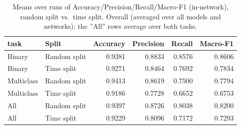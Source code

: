 \begin{table}
\caption{Means over runs of Accuracy/Precision/Recall/Macro-F1 (in-network), random split vs.\ time split. Overall (averaged over all models and networks); the ''All'' rows average over both tasks.}
\label{tab:q2_appendix_overall}
\begin{tabular}{llrrrr}
\toprule
task & Split & Accuracy & Precision & Recall & Macro-F1 \\
\midrule
Binary & Random split & 0.9381 & 0.8833 & 0.8576 & 0.8606 \\
Binary & Time split & 0.9271 & 0.8464 & 0.7692 & 0.7834 \\
Multiclass & Random split & 0.9413 & 0.8619 & 0.7500 & 0.7794 \\
Multiclass & Time split & 0.9186 & 0.7728 & 0.6652 & 0.6753 \\
All & Random split & 0.9397 & 0.8726 & 0.8038 & 0.8200 \\
All & Time split & 0.9229 & 0.8096 & 0.7172 & 0.7293 \\
\bottomrule
\end{tabular}
\end{table}

